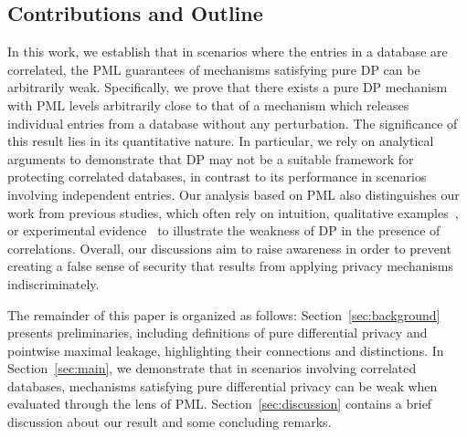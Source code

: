 \subsection{Contributions and Outline}
In this work, we establish that in scenarios where the entries in a database are correlated, the PML guarantees of mechanisms satisfying pure DP can be arbitrarily weak. Specifically, we prove that there exists a pure DP mechanism with PML levels arbitrarily close to that of a mechanism which releases individual entries from a database without any perturbation. The significance of this result lies in its quantitative nature. In particular, we rely on analytical arguments to demonstrate that DP may not be a suitable framework for protecting correlated databases, in contrast to its performance in scenarios involving independent entries. Our analysis based on PML also distinguishes our work from previous studies, which often rely on intuition, qualitative examples~\cite{kifer2012rigorous,yang2015bayesian,zhu2014correlated}, or experimental evidence~\cite{cormode2011personal,liu2016dependence} to illustrate the weakness of DP in the presence of correlations. Overall, our discussions aim to raise awareness in order to prevent creating a false sense of security that results from applying privacy mechanisms indiscriminately. 

The remainder of this paper is organized as follows: Section~\ref{sec:background} presents preliminaries, including definitions of pure differential privacy and pointwise maximal leakage, highlighting their connections and distinctions. In Section~\ref{sec:main}, we demonstrate that in scenarios involving correlated databases, mechanisms satisfying pure differential privacy can be weak when evaluated through the lens of PML. Section~\ref{sec:discussion} contains a brief discussion about our result and some concluding remarks.  

